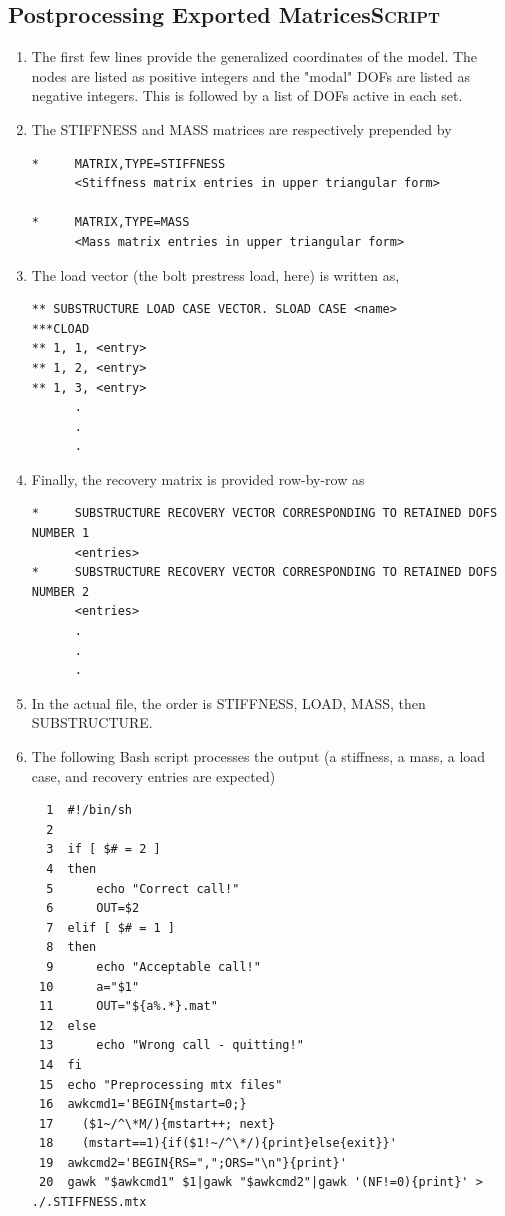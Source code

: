 \documentclass[11pt]{article}
\begin{document}
\subsection{Postprocessing Exported Matrices\hfill{}\textsc{Script}}
\label{sec:bscr}
\begin{enumerate}
\item The first few lines provide the generalized coordinates of the model. The nodes are listed as positive integers and the "modal" DOFs are listed as negative integers.
This is followed by a list of DOFs active in each set.
\item The STIFFNESS and MASS matrices are respectively prepended by
\begin{verbatim}
*     MATRIX,TYPE=STIFFNESS
      <Stiffness matrix entries in upper triangular form>

*     MATRIX,TYPE=MASS
      <Mass matrix entries in upper triangular form>      
\end{verbatim}
\item The load vector (the bolt prestress load, here) is written as,
\begin{verbatim}
** SUBSTRUCTURE LOAD CASE VECTOR. SLOAD CASE <name>
***CLOAD 
** 1, 1, <entry>
** 1, 2, <entry>
** 1, 3, <entry>
      .
      .
      .
\end{verbatim}
\item Finally, the recovery matrix is provided row-by-row as
\begin{verbatim}
*     SUBSTRUCTURE RECOVERY VECTOR CORRESPONDING TO RETAINED DOFS NUMBER 1
      <entries>
*     SUBSTRUCTURE RECOVERY VECTOR CORRESPONDING TO RETAINED DOFS NUMBER 2
      <entries>
      .
      .
      .
\end{verbatim}
\item In the actual file, the order is STIFFNESS, LOAD, MASS, then SUBSTRUCTURE.
\item The following Bash script processes the output (a stiffness, a mass, a load case, and recovery entries are expected)
\begin{verbatim}
  1  #!/bin/sh
  2  
  3  if [ $# = 2 ]
  4  then 
  5      echo "Correct call!"
  6      OUT=$2
  7  elif [ $# = 1 ]
  8  then
  9      echo "Acceptable call!"
 10      a="$1"
 11      OUT="${a%.*}.mat"
 12  else
 13      echo "Wrong call - quitting!"
 14  fi
 15  echo "Preprocessing mtx files"
 16  awkcmd1='BEGIN{mstart=0;}
 17    ($1~/^\*M/){mstart++; next}
 18    (mstart==1){if($1!~/^\*/){print}else{exit}}'
 19  awkcmd2='BEGIN{RS=",";ORS="\n"}{print}'
 20  gawk "$awkcmd1" $1|gawk "$awkcmd2"|gawk '(NF!=0){print}' > ./.STIFFNESS.mtx

\end{verbatim}
\end{enumerate}
\end{document}
